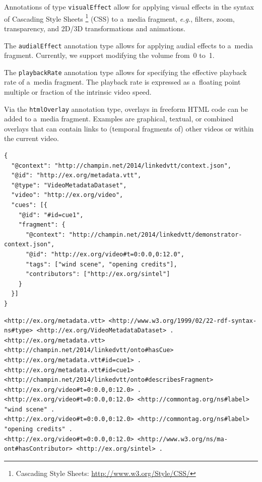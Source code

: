 \documentclass{sig-alternate}
\newcommand{\inlinelistingsize}{\fontsize{8pt}{11pt}}
\let\oldurl\url
\renewcommand{\url}[1]{\inlinelistingsize\oldurl{#1}}
\def\JSONLD{\mbox{JSON-LD}}
\begin{document}
\begin{description}[leftmargin=*]
  \item[Visual Effect] Annotations of
  type \texttt{visualEffect} allow for applying visual effects
  in the syntax of Cascading Style Sheets%
  \footnote{Cascading Style Sheets:
  \url{http://www.w3.org/Style/CSS/}} (CSS)
  to a~media fragment, \emph{e.g.},
  filters, zoom, transparency,
  and 2D/3D transformations and animations.

  \item[Audial Effect] The \texttt{audialEffect} annotation type
  allows for applying audial effects to a~media fragment.
  Currently, we support modifying the volume
  from~0 to~1.

  \item[Playback Rate] The \texttt{playbackRate}
  annotation type allows for specifying the effective
  playback rate of a~media fragment.
  The playback rate is expressed as a~floating point
  multiple or fraction of the intrinsic video speed.

  \item[HTML Overlay] Via the \texttt{htmlOverlay}
  annotation type, overlays in
  freeform HTML code can be added to a~media fragment.
  Examples are graphical, textual, or combined overlays
  that can contain links to (temporal fragments of)
  other videos or within the current video.
\end{description}

\begin{lstlisting}[caption={Generated \JSONLD\ file based on the WebVTT file 
    shown in \autoref{listing:webvtt}~(flat interpretaion)},
  label=listing:jsonld, float=t!]
{
  "@context": "http://champin.net/2014/linkedvtt/context.json",
  "@id": "http://ex.org/metadata.vtt", 
  "@type": "VideoMetadataDataset",
  "video": "http://ex.org/video", 
  "cues": [{
    "@id": "#id=cue1",
    "fragment": {
      "@context": "http://champin.net/2014/linkedvtt/demonstrator-context.json", 
      "@id": "http://ex.org/video#t=0:0.0,0:12.0", 
      "tags": ["wind scene", "opening credits"],
      "contributors": ["http://ex.org/sintel"]
    }
  }]
}
\end{lstlisting}

\begin{lstlisting}[caption={RDF triples based on the \JSONLD\ code from \autoref{listing:jsonld}},
  label=listing:rdftriples, float=t!]
<http://ex.org/metadata.vtt> <http://www.w3.org/1999/02/22-rdf-syntax-ns#type> <http://ex.org/VideoMetadataDataset> .
<http://ex.org/metadata.vtt> <http://champin.net/2014/linkedvtt/onto#hasCue> <http://ex.org/metadata.vtt#id=cue1> .
<http://ex.org/metadata.vtt#id=cue1> <http://champin.net/2014/linkedvtt/onto#describesFragment> <http://ex.org/video#t=0:0.0,0:12.0> .
<http://ex.org/video#t=0:0.0,0:12.0> <http://commontag.org/ns#label> "wind scene" .
<http://ex.org/video#t=0:0.0,0:12.0> <http://commontag.org/ns#label> "opening credits" .
<http://ex.org/video#t=0:0.0,0:12.0> <http://www.w3.org/ns/ma-ont#hasContributor> <http://ex.org/sintel> .
\end{lstlisting}
  
\end{document}
